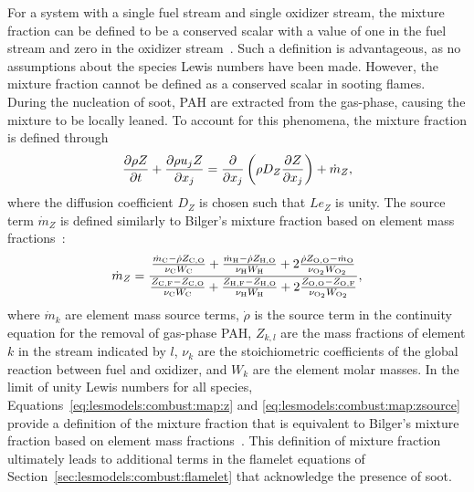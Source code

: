For a system with a single fuel stream and single oxidizer stream, the mixture fraction can be defined to be a conserved scalar with a value of one in the fuel stream and zero in the oxidizer stream~\cite{pitsch1998}. Such a definition is advantageous, as no assumptions about the species Lewis numbers have been made. However, the mixture fraction cannot be defined as a conserved scalar in sooting flames. During the nucleation of soot, PAH are extracted from the gas-phase, causing the mixture to be locally leaned. To account for this phenomena, the mixture fraction is defined through
\begin{equation}\label{eq:lesmodels:combust:map:z}
  \trder{Z} = \pder[]{x_j}\left( \rho D_Z \pder[Z]{x_j} \right) + \dot{m}_Z,
\end{equation}
where the diffusion coefficient $D_Z$ is chosen such that $Le_Z$ is unity. The source term $\dot{m}_Z$ is defined similarly to Bilger's mixture fraction based on element mass fractions~\cite{bilger1989}:
\begin{equation}\label{eq:lesmodels:combust:map:zsource}
  \dot{m}_Z = \frac{\frac{\dot{m}_{\ce{C}} - \dot{\rho}Z_{\ce{C},\ce{O}}}{\nu_{\ce{C}}W_{\ce{C}}} + \frac{\dot{m}_{\ce{H}} - \dot{\rho}Z_{\ce{H},\ce{O}}}{\nu_{\ce{H}}W_{\ce{H}}} + 2\frac{\dot{\rho}Z_{\ce{O},\ce{O}} - \dot{m}_{\ce{O}}}{\nu_{\ce{O2}}W_{\ce{O2}}}}{\frac{Z_{\ce{C},\ce{F}} - Z_{\ce{C},\ce{O}}}{\nu_{\ce{C}}W_{\ce{C}}} + \frac{Z_{\ce{H},\ce{F}} - Z_{\ce{H},\ce{O}}}{\nu_{\ce{H}}W_{\ce{H}}} + 2\frac{Z_{\ce{O},\ce{O}} - Z_{\ce{O},\ce{F}}}{\nu_{\ce{O2}}W_{\ce{O2}}}},
\end{equation}
where $\dot{m}_k$ are element mass source terms, $\dot{\rho}$ is the source term in the continuity equation for the removal of gas-phase PAH, $Z_{k,l}$ are the mass fractions of element $k$ in the stream indicated by $l$, $\nu_k$ are the stoichiometric coefficients of the global reaction between fuel and oxidizer, and $W_{k}$ are the element molar masses. In the limit of unity Lewis numbers for all species, Equations~\ref{eq:lesmodels:combust:map:z} and \ref{eq:lesmodels:combust:map:zsource} provide a definition of the mixture fraction that is equivalent to Bilger's mixture fraction based on element mass fractions~\cite{bilger1989}. This definition of mixture fraction ultimately leads to additional terms in the flamelet equations of Section~\ref{sec:lesmodels:combust:flamelet} that acknowledge the presence of soot.

